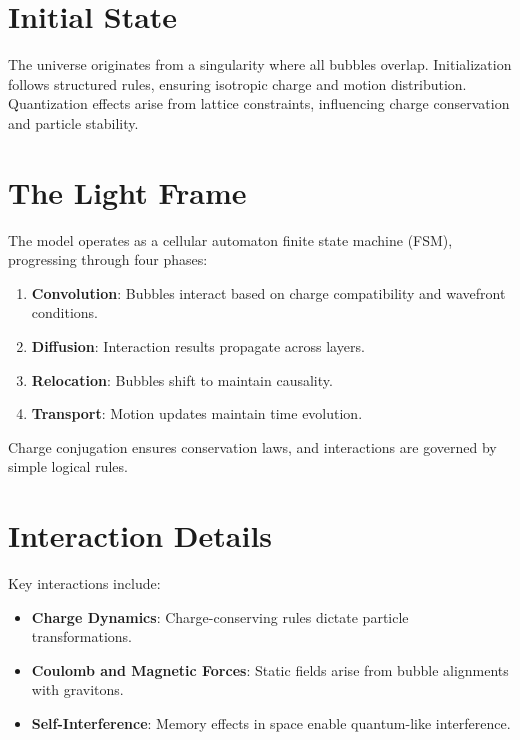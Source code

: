 \documentclass[12pt]{article}
\begin{document}
\section{Initial State}
The universe originates from a singularity where all bubbles overlap. Initialization follows structured rules, ensuring isotropic charge and motion distribution. Quantization effects arise from lattice constraints, influencing charge conservation and particle stability.

\section{The Light Frame}
The model operates as a cellular automaton finite state machine (FSM), progressing through four phases:
\begin{enumerate}
    \item \textbf{Convolution}: Bubbles interact based on charge compatibility and wavefront conditions.
    \item \textbf{Diffusion}: Interaction results propagate across layers.
    \item \textbf{Relocation}: Bubbles shift to maintain causality.
    \item \textbf{Transport}: Motion updates maintain time evolution.
\end{enumerate}
Charge conjugation ensures conservation laws, and interactions are governed by simple logical rules.

\section{Interaction Details}
Key interactions include:
\begin{itemize}
    \item \textbf{Charge Dynamics}: Charge-conserving rules dictate particle transformations.
    \item \textbf{Coulomb and Magnetic Forces}: Static fields arise from bubble alignments with gravitons.
    \item \textbf{Self-Interference}: Memory effects in space enable quantum-like interference.
\end{itemize}
\end{document}
